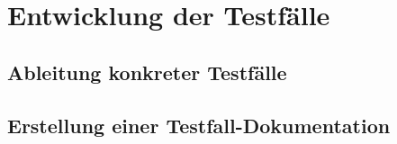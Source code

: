 \section{Entwicklung der Testfälle}\label{Entwicklung der Testfälle}

\subsection{Ableitung konkreter Testfälle}


\subsection{Erstellung einer Testfall-Dokumentation}

